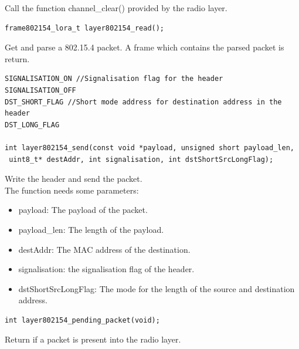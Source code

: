 \documentclass{article}
\begin{document}
Call the function channel\_clear() provided by the radio layer.
\begin{verbatim}
frame802154_lora_t layer802154_read();
\end{verbatim}
Get and parse a 802.15.4 packet. A frame which contains the parsed packet is return.
\begin{verbatim}
SIGNALISATION_ON //Signalisation flag for the header
SIGNALISATION_OFF
DST_SHORT_FLAG //Short mode address for destination address in the header
DST_LONG_FLAG

int layer802154_send(const void *payload, unsigned short payload_len,
 uint8_t* destAddr, int signalisation, int dstShortSrcLongFlag);
\end{verbatim}
Write the header and send the packet.\\
The function needs some parameters:
\begin{itemize}
  \item payload: The payload of the packet.
  \item payload\_len: The length of the payload.
  \item destAddr: The MAC address of the destination.
  \item signalisation: the signalisation flag of the header.
  \item dstShortSrcLongFlag: The mode for the length of the source and destination address.
\end{itemize}
\begin{verbatim}
int layer802154_pending_packet(void);
\end{verbatim}
Return if a packet is present into the radio layer.
\end{document}
